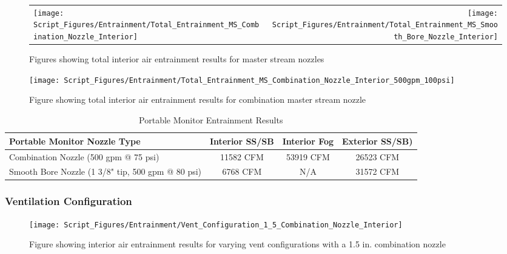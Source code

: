\documentclass{article}
\begin{document}
\begin{appendices}
\clearpage

\begin{figure}[!ht]
\begin{tabular*}{\textwidth}{lr}
\texttt{[image: Script\_Figures/Entrainment/Total\_Entrainment\_MS\_Combination\_Nozzle\_Interior]} &
\texttt{[image: Script\_Figures/Entrainment/Total\_Entrainment\_MS\_Smooth\_Bore\_Nozzle\_Interior]} \\
\end{tabular*}
\caption{Figures showing total interior air entrainment results for master stream nozzles}
\label{fig:MS_Interior_Total_Entrainment}
\end{figure}

\begin{figure}[!ht]
\centering
\texttt{[image: Script\_Figures/Entrainment/Total\_Entrainment\_MS\_Combination\_Nozzle\_Interior\_500gpm\_100psi]}
\caption{Figure showing total interior air entrainment results for combination master stream nozzle}
\label{fig:MS_Interior_Total_Entrainment_Combination}
\end{figure}

\clearpage

\begin{table}[!ht]
\centering
\begin{tabular}{|l|ccc|}
\hline
\textbf{Portable Monitor Nozzle Type} & \multicolumn{1}{c|}{\textbf{Interior SS/SB}} & \multicolumn{1}{c|}{\textbf{Interior Fog}} & \textbf{Exterior SS/SB)} \\ \hline
Combination Nozzle (500 gpm @ 75 psi) & 11582 CFM & 53919 CFM & 26523 CFM \\
Smooth Bore Nozzle (1 3/8" tip, 500 gpm @ 80 psi) & 6768 CFM & N/A & 31572 CFM \\ \hline
\end{tabular}
\caption{Portable Monitor Entrainment Results}
\label{Portable_Monitor_Entrainment_Results}
\end{table}

\clearpage

\subsubsection{Ventilation Configuration}

\begin{figure}[!ht]
\centering
\texttt{[image: Script\_Figures/Entrainment/Vent\_Configuration\_1\_5\_Combination\_Nozzle\_Interior]}
\caption{Figure showing interior air entrainment results for varying vent configurations with a 1.5 in. combination nozzle}
\label{fig:1_5_Interior_Combination_Vent_Config}
\end{figure}


\end{appendices}
\end{document}

